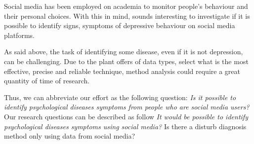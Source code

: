 
Social media has been employed on academia to monitor people's behaviour and their personal choices. With this in mind, sounds interesting to investigate if it is possible to identify signs, symptoms of depressive behaviour on social media platforms.

As said above, the task of identifying some disease, even if it is not depression, can be challenging. Due to the plant offers of data types, select what is the most effective, precise and reliable technique, method analysis could require a great quantity of time of research.
 
Thus, we can abbreviate our effort as the following question: \emph{Is it possible to identify psychological diseases symptoms from people who are social media users?}
Our research questions can be described as follow
\textit{It would be possible to identify psychological diseases symptoms using social media?}
Is there a disturb diagnosis method only using data from social media? 





